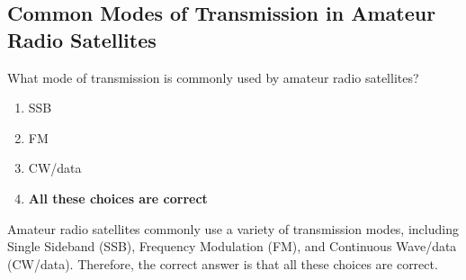 \subsection{Common Modes of Transmission in Amateur Radio Satellites}
\label{T8B04}

\begin{tcolorbox}[colback=gray!10!white,colframe=black!75!black,title=T8B04]
What mode of transmission is commonly used by amateur radio satellites?
\begin{enumerate}[noitemsep]
    \item SSB
    \item FM
    \item CW/data
    \item \textbf{All these choices are correct}
\end{enumerate}
\end{tcolorbox}

Amateur radio satellites commonly use a variety of transmission modes, including Single Sideband (SSB), Frequency Modulation (FM), and Continuous Wave/data (CW/data). Therefore, the correct answer is that all these choices are correct.